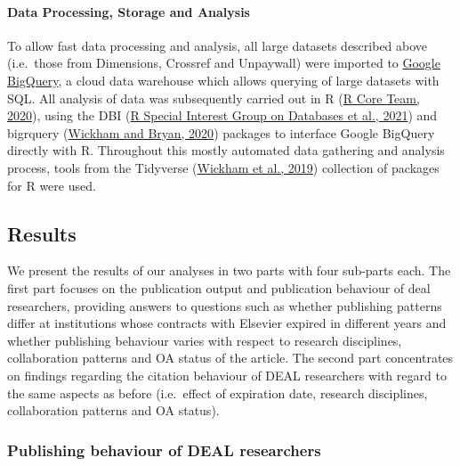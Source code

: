 \documentclass[
]{article}
\begin{document}
\hypertarget{data-processing-storage-and-analysis}{%
\paragraph{Data Processing, Storage and Analysis}\label{data-processing-storage-and-analysis}}

To allow fast data processing and analysis, all large datasets described above (i.e.~those from Dimensions, Crossref and Unpaywall) were imported to \href{https://cloud.google.com/bigquery}{Google BigQuery}, a cloud data warehouse which allows querying of large datasets with SQL. All analysis of data was subsequently carried out in R (\href{http://www.R-project.org/}{R Core Team, 2020}), using the DBI (\href{https://CRAN.R-project.org/package=DBI}{R Special Interest Group on Databases et al., 2021}) and bigrquery (\href{https://CRAN.R-project.org/package=bigrquery}{Wickham and Bryan, 2020}) packages to interface Google BigQuery directly with R. Throughout this mostly automated data gathering and analysis process, tools from the Tidyverse (\href{https://doi.org/10.21105/joss.01686}{Wickham et al., 2019}) collection of packages for R were used.

\hypertarget{results}{%
\subsection{Results}\label{results}}

We present the results of our analyses in two parts with four sub-parts each. The first part focuses on the publication output and publication behaviour of deal researchers, providing answers to questions such as whether publishing patterns differ at institutions whose contracts with Elsevier expired in different years and whether publishing behaviour varies with respect to research disciplines, collaboration patterns and OA status of the article.
The second part concentrates on findings regarding the citation behaviour of DEAL researchers with regard to the same aspects as before (i.e.~effect of expiration date, research disciplines, collaboration patterns and OA status).

\hypertarget{publishing-behaviour-of-deal-researchers}{%
\subsubsection{Publishing behaviour of DEAL researchers}\label{publishing-behaviour-of-deal-researchers}}
\end{document}

